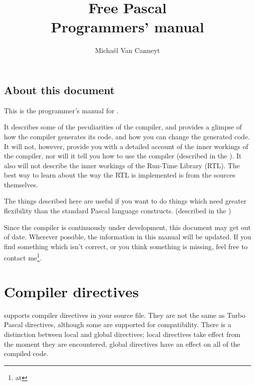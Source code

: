 \documentclass{report}
\begin{document}
\title{Free Pascal \\ Programmers' manual}

\author{Micha\"el Van Canneyt}
\maketitle
\tableofcontents
\newpage
\listoftables
\newpage

\section*{About this document}
This is the programmer's manual for \fpc.

It describes some of the peculiarities of the \fpc compiler, and provides a
glimpse of how the compiler generates its code, and how you can change the
generated code. It will not, however, provide you with a detailed account of
the inner workings of the compiler, nor will it tell you how to use the
compiler (described in the \userref). It also will not describe the inner
workings of the Run-Time Library (RTL). The best way to learn about the way
the RTL is implemented is from the sources themselves.

The things described here are useful if you want to do things which need
greater flexibility than the standard Pascal language constructs.
(described in the )

Since the compiler is continuously under development, this document may get
out of date. Wherever possible, the information in this manual will be
updated. If you find something which isn't correct, or you think something
 is missing, feel free to contact me\footnote{at
}.

\chapter{Compiler directives}
\label{ch:CompSwitch}

\fpc supports compiler directives in your source file. They are not the same
as Turbo Pascal directives, although some are supported for compatibility.
There is a distinction between local and global directives; local directives
take effect from the moment they are encountered, global directives have an
effect on all of the compiled code.
\end{document}
